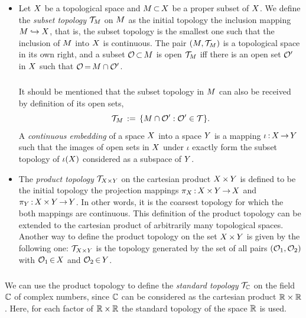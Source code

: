 \documentclass[11pt,twoside]{article}
\begin{document}
\begin{itemize}[leftmargin=12pt,itemsep=2pt]
\item[1.]
Let $X$ be a topological space
and $M {\,\subset\,} X$ be a proper subset of $X$.
We define the \textit{subset topology}
$\mathcal{T}_{M}$ on $M$
as the initial topology {\wrt} the inclusion mapping
$M \hookrightarrow X$,
that is,
the subset topology is the smallest one such that
the inclusion of $M$ into $X$ is continuous.
The pair $(M,\mathcal{T}_{M})$ is a topological space in its own right,
and a subset $\mathcal{O} {\,\subset\,} M$ is open {\wrt} $\mathcal{T}_{M}$
iff there is an open set $\mathcal{O}'$ in $X$
such that $\mathcal{O} {\,=\,} M \cap \mathcal{O}'$.

\subparagraph{}
It should be mentioned
that the subset topology in $M$ can also be received by definition
of its open sets,
\[
\mathcal{T}_{M} \,:=\, \{ M \cap \mathcal{O}': \mathcal{O}' \in {\mathcal{T}} \}.
\]
A \textit{continuous embedding} of a space $X$ into a space $Y$
is a mapping $\iota {\,:\,} X {\,\to\,} Y$
such that the images of open sets in $X$ under $\iota$ exactly
form the subset topology of $\iota(X)$ considered as a subspace
of $Y$.

\item[2.]
The \textit{product topology} $\mathcal{T}_{X \times Y}$
on the cartesian product $X {\,\times\,} Y$ is defined to be
the initial topology {\wrt} the projection mappings
$\pi_X {\,:\,} X {\,\times\,} Y {\,\to\,} X$ and
$\pi_Y {\,:\,} X {\,\times\,} Y {\,\to\,} Y$.
In other words,
it is the coarsest topology
for which the both mappings are continuous.
This definition of the product topology can be extended
to the cartesian product of arbitrarily many topological spaces.
Another way to define the product topology on the set $X {\,\times\,} Y$
is given by the following one:
$\mathcal{T}_{X \times Y}$ is the topology generated by the set of all pairs
$(\mathcal{O}_1,\mathcal{O}_2)$ with $\mathcal{O}_1 {\,\in\,} X$ and $\mathcal{O}_2 {\,\in\,} Y$.
\end{itemize}

\subparagraph{} %
We can use the product topology to define
the \textit{standard topology} $\mathcal{T}_{{\mathbb{C}}}$
on the field ${\mathbb{C}}$ of complex numbers,
since ${\mathbb{C}}$ can be considered as the cartesian product ${\mathbb{R}} \times {\mathbb{R}}$.
Here,
for each factor of ${\mathbb{R}} \times {\mathbb{R}}$ the standard topology
of the space ${\mathbb{R}}$ is used.

\end{document}
